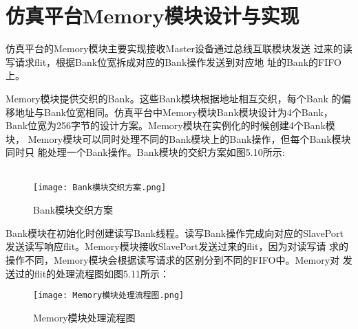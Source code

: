 

\section{仿真平台Memory模块设计与实现}

仿真平台的Memory模块主要实现接收Master设备通过总线互联模块发送
过来的读写请求flit，根据Bank位宽拆成对应的Bank操作发送到对应地
址的Bank的FIFO上。

Memory模块提供交织的Bank。这些Bank模块根据地址相互交织，每个Bank
的偏移地址与Bank位宽相同。仿真平台中Memory模块Bank模块设计为4个Bank，
Bank位宽为256字节的设计方案。Memory模块在实例化的时候创建4个Bank模块，
Memory模块可以同时处理不同的Bank模块上的Bank操作，但每个Bank模块同时只
能处理一个Bank操作。Bank模块的交织方案如图5.10所示:
\\
\\

\begin{figure}
    \centering
    \texttt{[image: Bank模块交织方案.png]}
    \caption{Bank模块交织方案}
    \label{fig:badge}
\end{figure}

Bank模块在初始化时创建读写Bank线程。读写Bank操作完成向对应的SlavePort
发送读写响应flit。Memory模块接收SlavePort发送过来的flit，因为对读写请
求的操作不同，Memory模块会根据读写请求的区别分到不同的FIFO中。Memory对
发送过的flit的处理流程图如图5.11所示：

\begin{figure}
    \centering
    \texttt{[image: Memory模块处理流程图.png]}
    \caption{Memory模块处理流程图}
    \label{fig:badge}
\end{figure}

